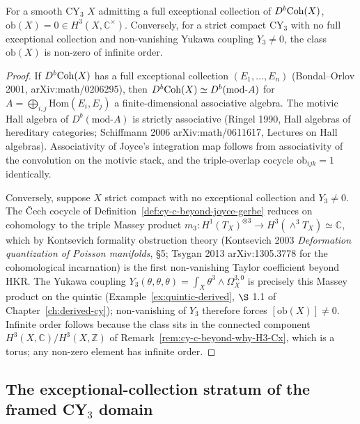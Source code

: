 \begin{proposition}
\label{prop:cy-c-beyond-joyce-vanishing}
For a smooth CY$_3$ $X$ admitting a full exceptional collection of $D^b\mathrm{Coh}(X)$,
$\mathrm{ob}(X) = 0 \in H^3(X, \mathbb{C}^\times)$. Conversely, for a strict
compact CY$_3$ with no full exceptional collection and non-vanishing Yukawa
coupling $Y_3 \neq 0$, the class $\mathrm{ob}(X)$ is non-zero of infinite order.
\end{proposition}

\begin{proof}
If $D^b\mathrm{Coh}(X)$ has a full exceptional collection $(E_1, \ldots, E_n)$ (Bondal--Orlov
2001, arXiv:math/0206295), then $D^b\mathrm{Coh}(X) \simeq D^b(\mathrm{mod}\text{-}A)$ for
$A = \bigoplus_{i,j} \mathrm{Hom}(E_i, E_j)$ a finite-dimensional associative
algebra. The motivic Hall algebra of $D^b(\mathrm{mod}\text{-}A)$ is strictly
associative (Ringel 1990, Hall algebras of hereditary categories; Schiffmann 2006
arXiv:math/0611617, Lectures on Hall algebras). Associativity of Joyce's
integration map follows from associativity of the convolution on the motivic
stack, and the triple-overlap cocycle $\mathrm{ob}_{ijk} = 1$ identically.

Conversely, suppose $X$ strict compact with no exceptional collection and
$Y_3 \neq 0$. The \v{C}ech cocycle of Definition~\ref{def:cy-c-beyond-joyce-gerbe}
reduces on cohomology to the triple Massey product
$m_3 \colon H^1(T_X)^{\otimes 3} \to H^3(\wedge^3 T_X) \simeq \mathbb{C}$, which by
Kontsevich formality obstruction theory (Kontsevich 2003 \emph{Deformation
quantization of Poisson manifolds}, \S 5; Tsygan 2013 arXiv:1305.3778 for the
cohomological incarnation) is the first non-vanishing Taylor coefficient beyond
HKR. The Yukawa coupling $Y_3(\theta, \theta, \theta) = \int_X \theta^3 \wedge
\Omega^{3,0}_X$ is precisely this Massey product on the quintic
(Example~\ref{ex:quintic-derived}, $\S$ 1.1 of
Chapter~\ref{ch:derived-cy}); non-vanishing of $Y_3$ therefore forces
$[\mathrm{ob}(X)] \ne 0$. Infinite order follows because the class sits in the
connected component $H^3(X, \mathbb{C})/H^3(X, \mathbb{Z})$ of
Remark~\ref{rem:cy-c-beyond-why-H3-Cx}, which is a torus; any non-zero element
has infinite order.
\end{proof}

\subsection{The exceptional-collection stratum of the framed CY\texorpdfstring{$_3$}{-3} domain}
\label{subsec:cy-c-beyond-exceptional-stratum}

